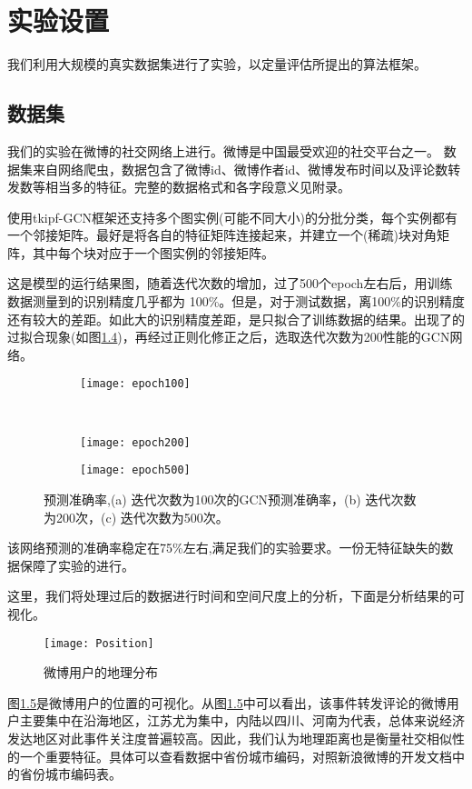 \chapter{实验设置}
\label{chap:experiment}

我们利用大规模的真实数据集进行了实验，以定量评估所提出的算法框架。

\section{数据集}\label{sec:dataset}
我们的实验在微博的社交网络上进行。微博是中国最受欢迎的社交平台之一。
数据集来自网络爬虫\cite{Ren2014WeiboEvents}，数据包含了微博id、微博作者id、微博发布时间以及评论数转发数等相当多的特征。完整的数据格式和各字段意义见附录。

使用tkipf-GCN框架\cite{kipf2017semi}还支持多个图实例(可能不同大小)的分批分类，每个实例都有一个邻接矩阵。最好是将各自的特征矩阵连接起来，并建立一个(稀疏)块对角矩阵，其中每个块对应于一个图实例的邻接矩阵。

这是模型的运行结果图，随着迭代次数的增加，过了500个epoch左右后，用训练数据测量到的识别精度几乎都为 100\%。但是，对于测试数据，离100\%的识别精度还有较大的差距。如此大的识别精度差距，是只拟合了训练数据的结果。出现了的过拟合现象(如图\ref{fig:epoch})，再经过正则化修正之后，选取迭代次数为200性能的GCN网络。
\begin{figure}[!htbp]
    \centering
    \begin{subfigure}[b]{0.35\textwidth}
      \texttt{[image: epoch100]}
      \caption{}
      \label{fig:epoch100}
    \end{subfigure}%
    ~%
    \begin{subfigure}[b]{0.35\textwidth}
      \texttt{[image: epoch200]}
      \caption{}
      \label{fig:epoch200}
    \end{subfigure}%
    \begin{subfigure}[b]{0.35\textwidth}
      \texttt{[image: epoch500]}
      \caption{}
      \label{fig:epoch500}
    \end{subfigure}%

    \caption{预测准确率,(a) 迭代次数为100次的GCN预测准确率，(b) 迭代次数为200次，(c) 迭代次数为500次。}
    \label{fig:epoch}
\end{figure}
该网络预测的准确率稳定在75\%左右,满足我们的实验要求。一份无特征缺失的数据保障了实验的进行。


这里，我们将处理过后的数据进行时间和空间尺度上的分析，下面是分析结果的可视化。
\begin{figure}[!htbp]
    \centering
    \texttt{[image: Position]}
    \caption{微博用户的地理分布}
    \label{fig:Position}
\end{figure}
图\ref{fig:Position}是微博用户的位置的可视化。从图\ref{fig:Position}中可以看出，该事件转发评论的微博用户主要集中在沿海地区，江苏尤为集中，内陆以四川、河南为代表，总体来说经济发达地区对此事件关注度普遍较高。因此，我们认为地理距离也是衡量社交相似性的一个重要特征。具体可以查看数据中省份城市编码，对照新浪微博的开发文档中的省份城市编码表。


